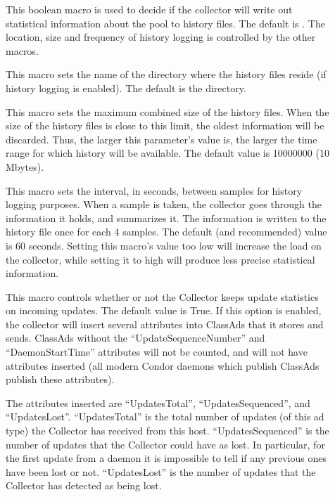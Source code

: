 \begin{description}
\item[] \label{param:KeepPoolHistory}
  This boolean macro is used to decide if the collector will write
  out statistical information about the pool to history files. The default
  is . The location, size and frequency of history logging is controlled
  by the other macros.

\item[] \label{param:PoolHistoryDir}
  This macro sets the name of the directory where the history
  files reside (if history logging is enabled).
  The default is the  directory.

\item[]
  \label{param:PoolHistoryMaxStorage} 
  This macro sets the maximum combined size of the history files.
  When the size of the history files is close to this limit, the oldest
  information will be discarded.
  Thus, the larger this parameter's value is, the larger the time
  range for which history will be available.  The default value is
  10000000 (10 Mbytes).

\item[]
  \label{param:PoolHistorySamplingInterval}
  This macro sets the interval, in seconds, between samples for
  history logging purposes. 
  When a sample is taken, the collector goes through the information
  it holds, and summarizes it.
  The information is written to the history file once for each 4
  samples.
  The default (and recommended) value is 60 seconds. Setting this
  macro's value too low will increase the load on the collector,
  while setting it to high will produce less precise statistical
  information.

\item[]
  \label{param:CollectorDaemonStats}
  This macro controls whether or not the Collector keeps update
  statistics on incoming updates.  The default value is True.  If
  this option is enabled, the collector will insert several attributes
  into ClassAds that it stores and sends.  ClassAds without the
  ``UpdateSequenceNumber'' and ``DaemonStartTime'' attributes will not
  be counted, and will not have attributes inserted (all modern Condor
  daemons which publish ClassAds publish these attributes).

  The attributes inserted are ``UpdatesTotal'', ``UpdatesSequenced'',
  and ``UpdatesLost''.  ``UpdatesTotal'' is the total number of
  updates (of this ad type) the Collector has received from this host.
  ``UpdatesSequenced'' is the number of updates that the Collector
  could have as lost.  In particular, for the first update from a
  daemon it is impossible to tell if any previous ones have been lost
  or not.  ``UpdatesLost'' is the number of updates that the Collector
  has detected as being lost.


\end{description}
